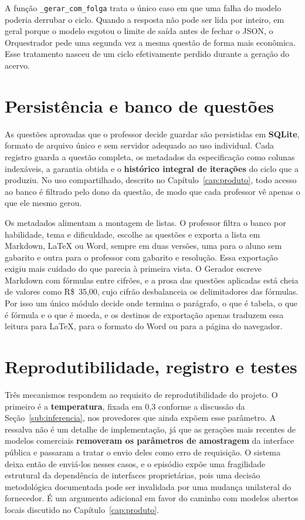 \noindent A função \texttt{\_gerar\_com\_folga} trata o único caso em que uma falha do modelo
poderia derrubar o ciclo. Quando a resposta não pode ser lida por inteiro, em geral porque o
modelo esgotou o limite de saída antes de fechar o JSON, o Orquestrador pede uma segunda vez a
mesma questão de forma mais econômica. Esse tratamento nasceu de um ciclo efetivamente perdido
durante a geração do acervo.

\section{Persistência e banco de questões}
\label{sec:persistencia}

As questões aprovadas que o professor decide guardar são persistidas em \textbf{SQLite}, formato
de arquivo único e sem servidor adequado ao uso individual. Cada registro guarda a questão
completa, os metadados da especificação como colunas indexáveis, a garantia obtida e o
\textbf{histórico integral de iterações} do ciclo que a produziu. No uso compartilhado, descrito
no Capítulo~\ref{cap:produto}, todo acesso ao banco é filtrado pelo dono da questão, de modo que
cada professor vê apenas o que ele mesmo gerou.

Os metadados alimentam a montagem de listas. O professor filtra o banco por habilidade, tema e
dificuldade, escolhe as questões e exporta a lista em Markdown, \LaTeX{} ou Word, sempre em duas
versões, uma para o aluno sem gabarito e outra para o professor com gabarito e resolução. Essa
exportação exigiu mais cuidado do que parecia à primeira vista. O Gerador escreve Markdown com
fórmulas entre cifrões, e a prosa das questões aplicadas está cheia de valores como R\$~35,00, cujo
cifrão desbalanceia os delimitadores das fórmulas. Por isso um único módulo decide onde termina o
parágrafo, o que é tabela, o que é fórmula e o que é moeda, e os destinos de exportação apenas
traduzem essa leitura para \LaTeX, para o formato do Word ou para a página do navegador.

\section{Reprodutibilidade, registro e testes}
\label{sec:reprodutibilidade}

Três mecanismos respondem ao requisito de reprodutibilidade do projeto. O primeiro é a
\textbf{temperatura}, fixada em 0,3 conforme a discussão da Seção~\ref{sub:inferencia}, nos
provedores que ainda expõem esse parâmetro. A ressalva não é um detalhe de implementação, já que
as gerações mais recentes de modelos comerciais \textbf{removeram os parâmetros de amostragem} da
interface pública e passaram a tratar o envio deles como erro de requisição. O sistema deixa então
de enviá-los nesses casos, e o episódio expõe uma fragilidade estrutural da dependência de
interfaces proprietárias, pois uma decisão metodológica documentada pode ser invalidada por uma
mudança unilateral do fornecedor. É um argumento adicional em favor do caminho com modelos abertos
locais discutido no Capítulo~\ref{cap:produto}.

